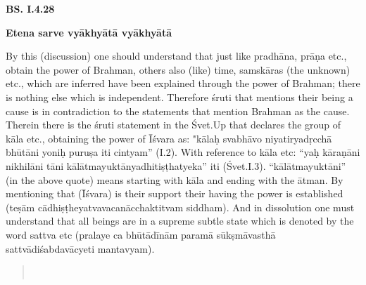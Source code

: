\textbf{}


\textbf{BS. I.4.28}

\textbf{Etena sarve vyākhyātā vyākhyātā}

By this (discussion) one should understand that just like pradhāna, prāṇa etc., obtain the power of Brahman, others also (like) time,  samskāras (the unknown) etc., which are inferred have been explained through the power of Brahman; there is nothing else which is independent. Therefore śruti that mentions their being a cause is in contradiction to the statements that mention Brahman as the cause. Therein there is the śruti statement in the Śvet.Up that declares the group of kāla etc., obtaining the power of Īśvara as: "kālaḥ svabhāvo niyatiryadṛcchā bhūtāni yoniḥ puruṣa iti cintyam” (I.2).  With reference to kāla etc: “yaḥ kāraṇāni nikhilāni tāni kālātmayuktānyadhitiṣṭhatyeka” iti (Śvet.I.3). “kālātmayuktāni” (in the above quote) means starting with kāla and ending with the ātman. By mentioning that (Īśvara) is their support their having the power is established (teṣām cādhiṣṭheyatvavacanācchaktitvam siddham). And in dissolution one must understand that all beings are in a supreme subtle state which is denoted by the word sattva etc (pralaye ca bhūtādīnām paramā sūkṣmāvasthā sattvādiśabdavācyeti mantavyam).



\begin{verse}
\\
\end{verse}

